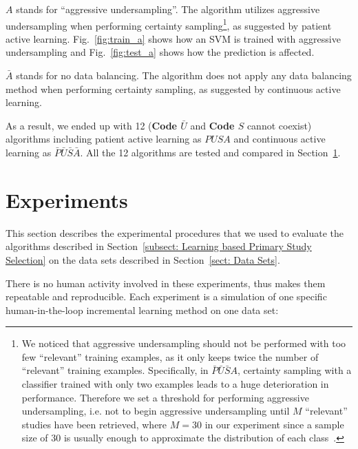 \documentclass{svjour3}
\theoremstyle{break}
\begin{document}
\begin{itemize}
\textbf{$A$} stands for ``aggressive undersampling''. The algorithm utilizes aggressive undersampling when performing certainty sampling\footnote{We noticed that aggressive undersampling should not be performed with too few ``relevant'' training examples, as it only keeps twice the number of ``relevant'' training examples. Specifically, in $\bar{P}\bar{U}\bar{S}A$, certainty sampling with a classifier trained with only two examples leads to a huge deterioration in performance. Therefore we set a threshold for performing aggressive undersampling, i.e. not to begin aggressive undersampling until $M$ ``relevant'' studies have been retrieved, where $M=30$ in our experiment since a sample size of $30$ is usually
enough to approximate the distribution of each class~\cite{isotalo2001basics}.}, as suggested by patient active learning. Fig.~\ref{fig:train_a} shows how an SVM is trained with aggressive undersampling and Fig.~\ref{fig:test_a} shows how the prediction is affected.

\textbf{$\bar{A}$} stands for no data balancing. The algorithm does not apply any data balancing method when performing certainty sampling, as suggested by continuous active learning.

\end{itemize}

As a result, we ended up with 12 (\textbf{Code $\bar{U}$} and \textbf{Code $S$} cannot coexist) algorithms including patient active learning as $PUSA$ and continuous active learning as $\bar{P}\bar{U}\bar{S}\bar{A}$. All the 12 algorithms are tested and compared in Section~\ref{sect: Experiments}.

\section{Experiments}
\label{sect: Experiments}

This section describes the experimental procedures that we used to evaluate the algorithms described in Section~\ref{subsect: Learning based Primary Study Selection} on the data sets described in Section~\ref{sect: Data Sets}. 

There is no human activity involved in these experiments, thus makes them repeatable and reproducible. Each experiment is a simulation of one specific human-in-the-loop incremental learning method on one data set:
\end{document}
